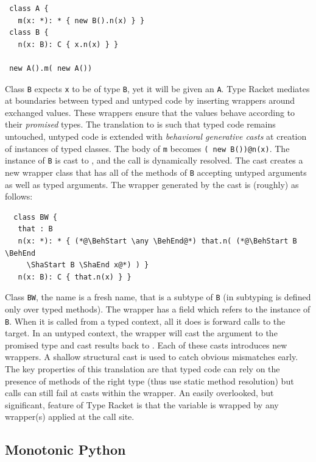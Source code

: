 \documentclass[a4paper,USenglish]{tex/lipics-v2016}
\newcommand{\code}[1]{{\tt #1}\xspace}
\begin{document}
\begin{lstlisting}
 class A {
   m(x: *): * { new B().n(x) } }
 class B {
   n(x: B): C { x.n(x) } }

 new A().m( new A())
\end{lstlisting}

\noindent Class \code B expects \code x to be of type \code B, yet it will
be given an \code A. Type Racket mediates at boundaries between typed and
untyped code by inserting wrappers around exchanged values. These wrappers
ensure that the values behave according to their \emph{promised} types. The
translation to \kafka is such that typed code remains untouched, untyped
code is extended with \emph{behavioral generative casts} at creation of
instances of typed classes. The body of \code m becomes {\tt ({\BehStart
    \any \BehEnd}new B())@n(x)}.  The instance of \code B is cast to \any,
and the call is dynamically resolved. The cast creates a new wrapper class
that has all of the methods of \code B accepting untyped arguments as well
as typed arguments. The wrapper generated by the cast is (roughly) as
follows:

\begin{lstlisting}
  class BW {
   that : B
   n(x: *): * { (*@\BehStart \any \BehEnd@*) that.n( (*@\BehStart B \BehEnd
     \ShaStart B \ShaEnd x@*) ) }
   n(x: B): C { that.n(x) } }
\end{lstlisting}

\noindent Class \code{BW}, the name is a fresh name, that is a subtype of
\code B (in \kafka subtyping is defined only over typed methods).  The
wrapper has a field \that which refers to the instance of \code B. When it
is called from a typed context, all it does is forward calls to the
target. In an untyped context, the wrapper will cast the argument to the
promised type and cast results back to \any. Each of these casts introduces
new wrappers. A shallow structural cast is used to catch obvious mismatches
early.  The key properties of this translation are that typed code can rely
on the presence of methods of the right type (thus use static method
resolution) but calls can still fail at casts within the wrapper. An easily 
overlooked, but significant, feature of Type Racket is that the \this variable
is wrapped by any wrapper(s) applied at the call site.

\subsection{Monotonic Python}
\end{document}
